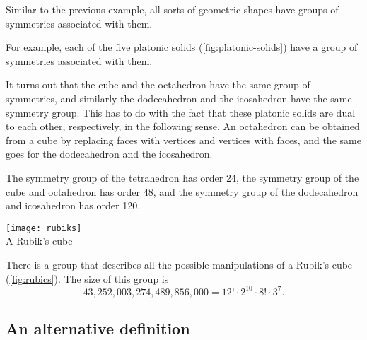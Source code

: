 
\begin{example}
Similar to the previous example, all sorts of geometric shapes have groups of symmetries associated with them. 

For example, each of the five platonic solids (\cref{fig:platonic-solids}) have a group of symmetries associated with them. 

It turns out that the cube and the octahedron have the same group of symmetries, and similarly the dodecahedron and the icosahedron have the same symmetry group. This has to do with the fact that these platonic solids are dual to each other, respectively, in the following sense. An octahedron can be obtained from a cube by replacing faces with vertices and vertices with faces, and the same goes for the dodecahedron and the icosahedron.

The symmetry group of the tetrahedron has order 24, the symmetry group of the cube and octahedron has order 48, and the symmetry group of the dodecahedron and icosahedron has order 120.
\end{example}

\begin{marginfigure}
\centering
\texttt{[image: rubiks]} \\
    \caption{A Rubik's cube}
    \label{fig:rubics}
\end{marginfigure}

\begin{example}
There is a group that describes all the possible manipulations of a Rubik's cube (\cref{fig:rubics}). The size of this group is 
\begin{equation*}
43,252,003,274,489,856,000 = 12! \cdot 2^{10} \cdot 8! \cdot 3^7.
\end{equation*}
\end{example}



\subsection{An alternative definition}

